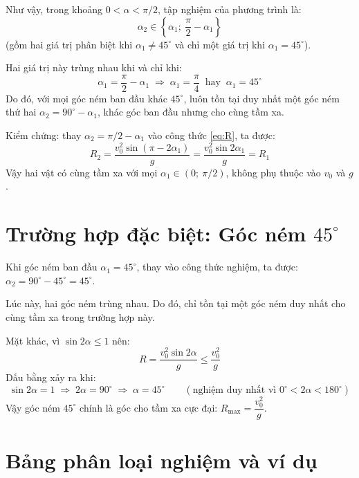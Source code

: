 Như vậy, trong khoảng $0 < \alpha < \pi/2$, tập nghiệm của phương trình là:
\[ \alpha_2 \in \left\{ \alpha_1;\ \frac{\pi}{2} - \alpha_1 \right\} \]
(gồm hai giá trị phân biệt khi $\alpha_1 \neq 45^\circ$ và chỉ một giá trị khi $\alpha_1 = 45^\circ$).

Hai giá trị này trùng nhau khi và chỉ khi:
\[ \alpha_1 = \frac{\pi}{2} - \alpha_1 \;\Longrightarrow\; \alpha_1 = \frac{\pi}{4} \ \text{ hay }\ \alpha_1 = 45^\circ \]
Do đó, với mọi góc ném ban đầu khác $45^\circ$, luôn tồn tại duy nhất một góc ném thứ hai $\alpha_2 = 90^\circ - \alpha_1$, khác góc ban đầu nhưng cho cùng tầm xa.

Kiểm chứng: thay $\alpha_2 = \pi/2 - \alpha_1$ vào công thức \eqref{eq:R}, ta được:
\[ R_2 = \frac{v_0^2\sin(\pi - 2\alpha_1)}{g} = \frac{v_0^2\sin 2\alpha_1}{g} = R_1 \]
Vậy hai vật có cùng tầm xa với mọi $\alpha_1 \in (0;\ \pi/2)$, không phụ thuộc vào $v_0$ và $g$.

\section{Trường hợp đặc biệt: Góc ném \texorpdfstring{$45^\circ$}{45°}}
Khi góc ném ban đầu $\alpha_1 = 45^\circ$, thay vào công thức nghiệm, ta được: $\alpha_2 = 90^\circ - 45^\circ = 45^\circ$.

Lúc này, hai góc ném trùng nhau. Do đó, chỉ tồn tại một góc ném duy nhất cho cùng tầm xa trong trường hợp này.

Mặt khác, vì $\sin 2\alpha \le 1$ nên:
\[ R = \frac{v_0^2\sin 2\alpha}{g} \le \frac{v_0^2}{g} \]
Dấu bằng xảy ra khi:
\[ \sin 2\alpha = 1 \;\Longrightarrow\; 2\alpha = 90^\circ \;\Longrightarrow\; \alpha = 45^\circ \qquad (\text{nghiệm duy nhất vì } 0^\circ < 2\alpha < 180^\circ) \]
Vậy góc ném $45^\circ$ chính là góc cho tầm xa cực đại: $R_{\max} = \dfrac{v_0^2}{g}$.

\section{Bảng phân loại nghiệm và ví dụ}

